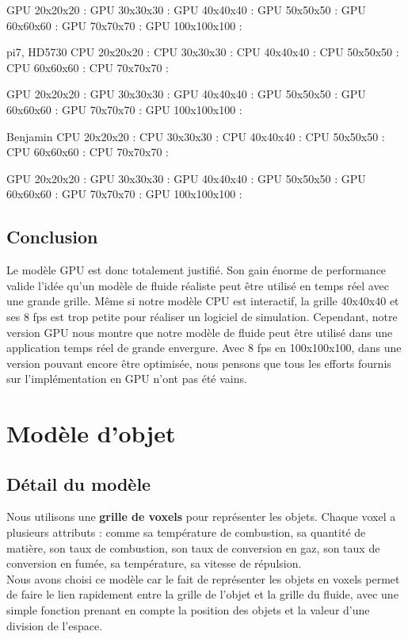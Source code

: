 \documentclass[a4paper,10pt]{article}
\begin{document}
  GPU 20x20x20      : 
  GPU 30x30x30      : 
  GPU 40x40x40      :
  GPU 50x50x50      : 
  GPU 60x60x60      : 
  GPU 70x70x70      :
  GPU 100x100x100   :
  
pi7, HD5730
  CPU 20x20x20      :
  CPU 30x30x30      : 
  CPU 40x40x40      : 
  CPU 50x50x50      :
  CPU 60x60x60      :
  CPU 70x70x70      : 
  
  GPU 20x20x20      : 
  GPU 30x30x30      : 
  GPU 40x40x40      :
  GPU 50x50x50      : 
  GPU 60x60x60      : 
  GPU 70x70x70      :
  GPU 100x100x100   :
  
Benjamin
  CPU 20x20x20      :
  CPU 30x30x30      : 
  CPU 40x40x40      : 
  CPU 50x50x50      :
  CPU 60x60x60      :
  CPU 70x70x70      : 
  
  GPU 20x20x20      : 
  GPU 30x30x30      : 
  GPU 40x40x40      :
  GPU 50x50x50      : 
  GPU 60x60x60      : 
  GPU 70x70x70      :
  GPU 100x100x100   :





\subsection{Conclusion}
Le modèle GPU est donc totalement justifié. Son gain énorme de performance valide l'idée
qu'un modèle de fluide réaliste peut être utilisé en temps réel avec une grande grille. 
Même si notre modèle CPU est interactif, la grille 40x40x40 et ses 8 fps est
trop petite pour réaliser un logiciel de simulation. Cependant, notre version GPU
nous montre que notre modèle de fluide peut être utilisé dans une application 
temps réel de grande envergure. Avec 8 fps en 100x100x100, dans une version
pouvant encore être optimisée, nous pensons que tous les efforts fournis
sur l'implémentation en GPU n'ont pas été vains. 




\newpage
\section{Modèle d'objet}

\subsection{Détail du modèle}
Nous utilisons une \textbf{grille de voxels} pour représenter les objets. Chaque voxel
a plusieurs attributs : comme sa température de combustion, sa quantité de matière,
son taux de combustion, son taux de conversion en gaz, son taux de conversion en fumée,
sa température, sa vitesse de répulsion.\\
Nous avons choisi ce modèle car le fait de représenter les objets en voxels
permet de faire le lien rapidement entre la grille de l'objet et la grille du fluide,
avec une simple fonction prenant en compte la position des objets et la valeur d'une division
de l'espace.\\
\end{document}

